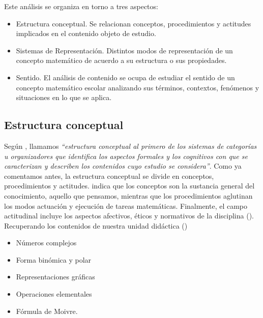 \documentclass[../main.tex]{memoir}
\begin{document}
Este análisis se organiza en torno a tres aspectos:

\begin{itemize}
	\item Estructura conceptual. Se relacionan conceptos, procedimientos y actitudes implicados en el contenido objeto de estudio.
	\item Sistemas de Representación. Distintos modos de representación de un concepto matemático de acuerdo a su estructura o sus propiedades.
	\item Sentido. El análisis de contenido se ocupa de estudiar el sentido de un concepto matemático escolar analizando sus términos, contextos, fenómenos y situaciones en lo que se aplica.
\end{itemize}


\subsection{Estructura conceptual}

Según \cite{rico2016}, llamamos \textit{``estructura conceptual al primero de los sistemas de categorías u organizadores que identifica los aspectos formales y los cognitivos con que se caracterizan y describen los contenidos cuyo estudio se considera''}. Como ya comentamos antes, la estructura conceptual se divide en conceptos, procedimientos y actitudes. \cite{rico1997} indica que los conceptos son la sustancia general del conocimiento, aquello que pensamos, mientras que los procedimientos aglutinan los modos actuación y ejecución de tareas matemáticas. Finalmente, el campo actitudinal incluye los aspectos afectivos, éticos y normativos de la disciplina (\cite{rico2016}). Recuperando los contenidos de nuestra unidad didáctica (\cite{RD1105})

\begin{itemize}
	\item Números complejos
	\item Forma binómica y polar
	\item Representaciones gráficas
	\item Operaciones elementales
	\item Fórmula de Moivre.
\end{itemize}
\end{document}
